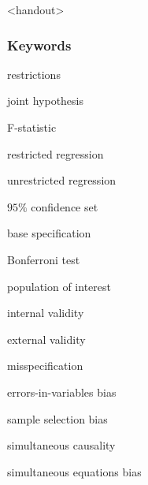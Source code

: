 

\begin{frame}<handout>
\frametitle{Keywords}
\begin{iteminline}
\item restrictions
\item joint hypothesis
\item F-statistic
\item restricted regression
\item unrestricted regression
\item $95\%$ confidence set
\item base specification
\item Bonferroni test
\item population of interest
\item internal validity
\item external validity
\item misspecification
\item errors-in-variables bias
\item sample selection bias
\item simultaneous causality
\item simultaneous equations bias
\end{iteminline}
\end{frame}


